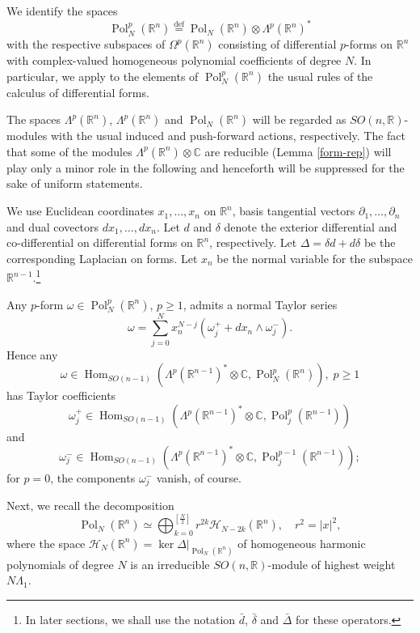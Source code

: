 \documentclass[a4paper,12pt,reqno]{amsart}
\numberwithin{theorem}{subsection}
\numberwithin{equation}{section}
\begin{document}
We identify the spaces
$$
   {\operatorname{Pol}}_N^p({\mathbb{R}}^n) {\stackrel{\text{def}}{=}} {\operatorname{Pol}}_N({\mathbb{R}}^n) \otimes \Lambda^p({\mathbb{R}}^n)^*
$$
with the respective subspaces of $\Omega^p({\mathbb{R}}^n)$ consisting
of differential $p$-forms on ${\mathbb{R}}^n$ with complex-valued homogeneous polynomial
coefficients of degree $N$. In particular, we apply to the elements of
${\operatorname{Pol}}_N^p({\mathbb{R}}^n)$ the usual rules of the calculus of differential forms.

The spaces $\Lambda^p({\mathbb{R}}^n)$, $\Lambda^p({\mathbb{R}}^n)$ and ${\operatorname{Pol}}_N({\mathbb{R}}^n)$ will be
regarded as $SO(n,{\mathbb{R}})$-modules with the usual induced and push-forward actions,
respectively. The fact that some of the modules $\Lambda^p({\mathbb{R}}^n) \otimes {\mathbb{C}}$
are reducible (Lemma \ref{form-rep}) will play only a minor role in the
following and henceforth will be suppressed for the sake of uniform statements.

We use Euclidean coordinates $x_1,\dots,x_n$ on ${\mathbb{R}}^n$, basis tangential
vectors $\partial_1,\dots,\partial_n$ and dual covectors $dx_1,\dots,dx_n$. Let
${d}$ and $\delta$ denote the exterior differential and co-differential on
differential forms on ${\mathbb{R}}^n$, respectively. Let $\Delta = \delta {d} + {d}
\delta$ be the corresponding Laplacian on forms. Let $x_n$ be the normal
variable for the subspace ${\mathbb{R}}^{n-1}$.\footnote{In later sections, we shall use
the notation $\bar{d}$, $\bar{\delta}$ and $\bar{\Delta}$ for these operators.}

Any $p$-form $\omega \in {\operatorname{Pol}}^p_N({\mathbb{R}}^n)$, $p \ge 1$, admits a normal Taylor
series
\begin{equation}\label{Taylor}
   \omega = \sum_{j=0}^N x_n^{N-j} (\omega_j^+ + dx_n \wedge \omega_j^-).
\end{equation}
Hence any
$$
   \omega \in {\operatorname{Hom}}_{SO(n-1)}(\Lambda^p ({\mathbb{R}}^{n-1})^* \otimes {\mathbb{C}},{\operatorname{Pol}}^p_N({\mathbb{R}}^n)), \; p\ge 1
$$
has Taylor coefficients
$$
   \omega_j^+ \in {\operatorname{Hom}}_{SO(n-1)}(\Lambda^p ({\mathbb{R}}^{n-1})^* \otimes {\mathbb{C}},{\operatorname{Pol}}^p_j({\mathbb{R}}^{n-1}))
$$
and
$$
   \omega_j^- \in {\operatorname{Hom}}_{SO(n-1)}(\Lambda^p ({\mathbb{R}}^{n-1})^* \otimes {\mathbb{C}},{\operatorname{Pol}}^{p-1}_j({\mathbb{R}}^{n-1}));
$$
for $p=0$, the components $\omega_j^-$ vanish, of course.

Next, we recall the decomposition
$$
   {\operatorname{Pol}}_N({\mathbb{R}}^n) \simeq \bigoplus_{k=0}^{\left[\frac{N}{2}\right]} r^{2k} {\mathcal H}_{N-2k}({\mathbb{R}}^n), \quad r^2 = |x|^2,
$$
where the space ${\mathcal H}_N({\mathbb{R}}^n) = \ker \Delta |_{{\operatorname{Pol}}_N({\mathbb{R}}^n)}$ of homogeneous
harmonic polynomials of degree $N$ is an irreducible $SO(n,{\mathbb{R}})$-module of
highest weight $N \Lambda_1$.
\end{document}
